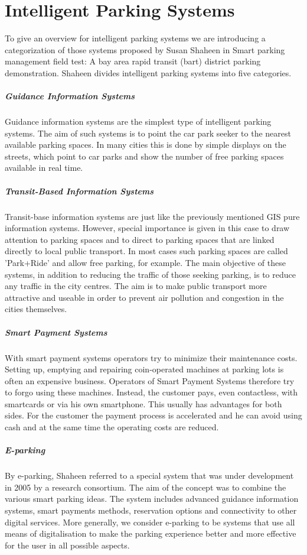 \section{Intelligent Parking Systems}
To give an overview for intelligent parking systems we are introducing a categorization of those systems proposed by Susan Shaheen in Smart parking management field test: A bay area rapid transit (bart) district parking demonstration.\cite{shaheen2005smart} Shaheen divides intelligent parking systems into five categories.
\subparagraph{Guidance Information Systems}
Guidance information systems are the simplest type of intelligent parking systems. The aim of such systems is to point the car park seeker to the nearest available parking spaces. In many cities this is done by simple displays on the streets, which point to car parks and show the number of free parking spaces available in real time.

\subparagraph{Transit-Based Information Systems}
Transit-base information systems are just like the previously mentioned GIS pure information systems. However, special importance is given in this case to draw attention to parking spaces and to direct to parking spaces that are linked directly to local public transport. In most cases such parking spaces are called 'Park+Ride' and allow free parking, for example. The main objective of these systems, in addition to reducing the traffic of those seeking parking, is to reduce any traffic in the city centres. The aim is to make public transport more attractive and useable in order to prevent air pollution and congestion in the cities themselves. 

\subparagraph{Smart Payment Systems}
With smart payment systems operators try to minimize their maintenance costs. Setting up, emptying and repairing coin-operated machines at parking lots is often an expensive business. Operators of Smart Payment Systems therefore try to forgo using these machines. Instead, the customer pays, even contactless, with smartcards or via his own smartphone. This usually has advantages for both sides. For the customer the payment process is accelerated and he can avoid using cash and at the same time the operating costs are reduced.

\subparagraph{E-parking}
By e-parking, Shaheen referred to a special system that was under development in 2005 by a research consortium. The aim of the concept was to combine the various smart parking ideas. The system includes advanced guidance information systems, smart payments methods, reservation options and connectivity to other digital services. More generally, we consider e-parking to be systems that use all means of digitalisation to make the parking experience better and more effective for the user in all possible aspects.

